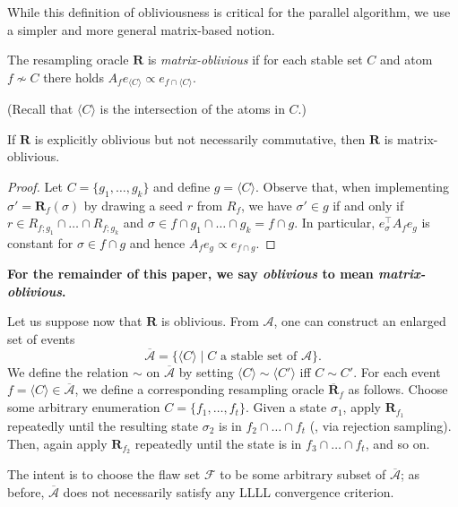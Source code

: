 \documentclass{toc}
\newcommand\oa{\overline{\mathcal A}}
\newcommand\obr{\overline{\mathbf R}}
\begin{document}
While this definition of obliviousness is critical for the parallel algorithm, we use a simpler and more general matrix-based notion.

\begin{definition}
The resampling oracle $\mathbf R$ is \emph{matrix-oblivious} if for each stable set $C$ and atom $f \not \sim C$ there holds $ A_f e_{\langle C \rangle} \propto e_{f \cap \langle C \rangle}$.

 (Recall that $\langle C \rangle$ is the intersection of the atoms in $C$.)
\end{definition}

\begin{proposition}
\label{obl-p0}
If $\mathbf R$ is explicitly oblivious but not necessarily commutative, then $\mathbf R$ is matrix-oblivious.
  \end{proposition}
  \begin{proof}
  Let $C = \{g_1, \dots, g_k \}$ and define $g = \langle C \rangle$. Observe that, when implementing $\sigma' = \mathbf R_f(\sigma)$ by drawing a seed $r$ from $R_f$, we have $\sigma' \in g$ if and only if $r \in R_{f;g_1} \cap \dots \cap R_{f;g_k}$ and $\sigma \in f \cap g_1 \cap \dots \cap g_k = f \cap g$.  In particular, $e_{\sigma}^{\top} A_f e_g$ is constant for $\sigma \in f \cap g$ and hence $A_f e_g \propto e_{f \cap g}$.  
  \end{proof}
  
\textbf{For the remainder of this paper, we say \emph{oblivious} to mean \emph{matrix-oblivious}.}  

Let us suppose now that $\mathbf R$ is oblivious.   From $\mathcal A$, one can construct an enlarged set of events 
$$
\oa = \{ \langle C \rangle \mid \text{$C$ a stable set of $\mathcal A$} \}.
$$
We define the relation $\sim$ on $\oa$ by setting $\langle C \rangle \sim \langle C' \rangle$ iff $C \sim C'$. For each event $f = \langle C \rangle \in \oa$, we define a corresponding resampling oracle $\obr_f$ as follows. Choose some arbitrary enumeration $C = \{ f_1, \dots, f_t \}$. Given a state $\sigma_1$, apply $\mathbf R_{f_1}$ repeatedly until the resulting state $\sigma_2$ is in $f_2 \cap \dots \cap f_t$ (\ie, via rejection sampling). Then, again apply $\mathbf R_{f_2}$ repeatedly until the state is in $f_3 \cap \dots \cap f_t$, and so on.

 The intent is to choose the flaw set $\mathcal F$ to be some arbitrary subset of $\oa$;  as before, $\oa$ does not necessarily satisfy any LLLL convergence criterion.   
\end{document}
